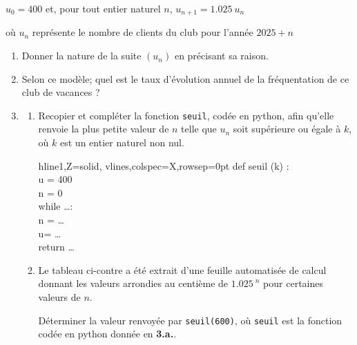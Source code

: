 \documentclass[10pt]{article}
\providecommand{\np}[2][]{{#2~#1}}
\begin{document}
\begin{center}
	\mbox{$u_0=400$} \quad et, pour tout entier naturel $n$, \quad \mbox{$u_{n+1}=\np{1.025}u_n$}
\end{center}

où $u_n$ représente le nombre de clients du club pour l'année \mbox{$2025+n$}
\begin{enumerate}
	\item Donner la nature de la suite $(u_n)$ en précisant sa raison.
	\item Selon ce modèle; quel est le taux d'évolution annuel de la fréquentation de ce club de vacances ?
	\item
	 \begin{enumerate}
	\item
	\begin{minipage}[t]{0.66\linewidth}\vspace{0mm}
		Recopier et compléter la fonction \texttt{seuil}, codée en python, afin qu'elle renvoie la plus petite valeur de $n$ telle que $u_n$ soit supérieure ou égale à $k$, où $k$ est un entier naturel non nul.

\end{minipage}
\hspace{0.05\linewidth}
	\begin{minipage}[t]{0.33\linewidth}\vspace{0cm}
\begin{ttfamily}
\begin{tblr}{hline{1,Z}={solid}, vlines,colspec={X},rowsep=0pt}
	def seuil (k) :\\
	\qquad u = 400\\
	\qquad n = 0\\
	\qquad while  \dots :\\
	\qquad\qquad  n = \dots\\
	\qquad\qquad  u= \dots\\
	\qquad return \dots\\
\end{tblr}
\end{ttfamily}
\end{minipage}

	\item \begin{minipage}[t]{0.45\linewidth}
Le tableau ci-contre a été extrait d'une feuille automatisée de calcul donnant les valeurs arrondies au centième de \mbox{$\np{1.025}^n$} pour certaines valeurs de $n$.

	\bigskip

	Déterminer la valeur renvoyée par \texttt{seuil(600)}, où \texttt{seuil} est la fonction codée en python donnée en \textbf{3.a.}.


\end{minipage}
\end{enumerate}
\end{enumerate}
\end{document}
